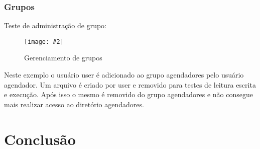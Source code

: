 \documentclass[
	12pt,				%
	openany,			%
	a4paper,			%
	chapter=TITLE,		%
	section=TITLE,		%
	english,
	brazil				%
]{abntex2}
\newcommand{\includeImage}[3] {

\begin{figure}[H]
 	 \centering
  		\texttt{[image: \#2]}
  	\caption{#3}
\end{figure}

}
\begin{document}
\subsection{Grupos}

Teste de administração de grupo:

\includeImage{0.8}{imgs/5_gerenciamento_grupos/permissao_restringida_apenas_para_os_grupos.png}{Gerenciamento de grupos}

Neste exemplo o usuário user é adicionado ao grupo agendadores pelo usuário agendador. Um arquivo é criado por user e removido para testes de leitura escrita e execução. Após isso o mesmo é removido do grupo agendadores e não consegue mais realizar acesso ao diretório agendadores.

\chapter{Conclusão}
\end{document}
